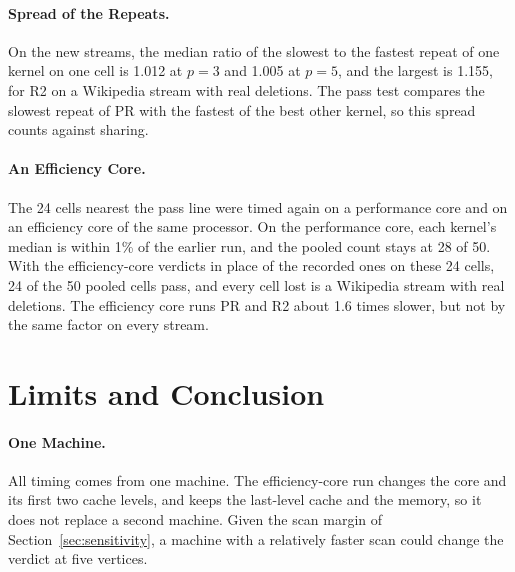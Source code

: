 \paragraph{Spread of the Repeats.}
On the new streams, the median ratio of the slowest to the fastest repeat of one kernel on one cell is 1.012 at $p = 3$ and 1.005 at $p = 5$, and the largest is 1.155, for R2 on a Wikipedia stream with real deletions.
The pass test compares the slowest repeat of PR with the fastest of the best other kernel, so this spread counts against sharing.

\paragraph{An Efficiency Core.}
The 24 cells nearest the pass line were timed again on a performance core and on an efficiency core of the same processor.
On the performance core, each kernel's median is within 1\% of the earlier run, and the pooled count stays at 28 of 50.
With the efficiency-core verdicts in place of the recorded ones on these 24 cells, 24 of the 50 pooled cells pass, and every cell lost is a Wikipedia stream with real deletions.
The efficiency core runs PR and R2 about 1.6 times slower, but not by the same factor on every stream.

\section{Limits and Conclusion}
\label{sec:conclusion}

\paragraph{One Machine.}
All timing comes from one machine.
The efficiency-core run changes the core and its first two cache levels, and keeps the last-level cache and the memory, so it does not replace a second machine.
Given the scan margin of Section~\ref{sec:sensitivity}, a machine with a relatively faster scan could change the verdict at five vertices.

